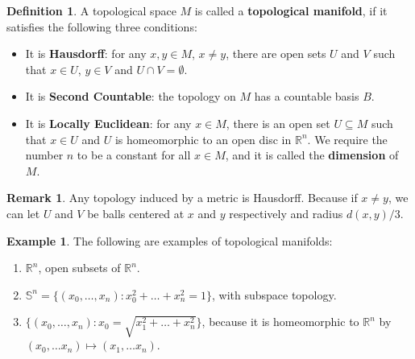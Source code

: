 \documentclass{article}
\theoremstyle{definition}
\newtheorem{dfn}[thm]{Definition}
\newtheorem{rmk}[thm]{Remark}
\newtheorem{exm}[thm]{Example}
\begin{document}
\begin{dfn}
    A topological space $M$ is called a {\bf topological manifold}, if it satisfies the following three conditions:
    \begin{itemize}
        \item It is {\bf Hausdorff}: for any $x, y\in M$, $x\not=y$, there are open sets $U$ and $V$ such that $x\in U$, $y\in V$ and $U\cap V=\emptyset$.
        \item It is {\bf Second Countable}: the topology on $M$ has a countable basis $B$.
        \item It is {\bf Locally Euclidean}: for any $x\in M$, there is an open set $U\subseteq M$ such that $x\in U$ and $U$ is homeomorphic to an open disc in $\mathbb{R}^n$. We require the number $n$ to be a constant for all $x\in M$, and it is called the {\bf dimension} of $M$. 
    \end{itemize}
\end{dfn}

\begin{rmk}
    Any topology induced by a metric is Hausdorff. Because if $x\not=y$, we can let $U$ and $V$ be balls centered at $x$ and $y$ respectively and radius $d(x, y)/3$.
\end{rmk}

\begin{exm}
    The following are examples of topological manifolds:
    \begin{enumerate}
        \item $\mathbb{R}^n$, open subsets of $\mathbb{R}^n$.
        \item $\mathbb{S}^n=\{(x_0, \dots, x_n): x_0^2+\dots +x_n^2=1\}$, with subspace topology.
        \item $\{(x_0, \dots, x_n): x_0=\sqrt{x_1^2+\dots+x_n^2}\}$, because it is homeomorphic to $\mathbb{R}^n$ by $(x_0, \dots x_n)\mapsto (x_1, \dots x_n)$.
    \end{enumerate}
\end{exm}
\end{document}
